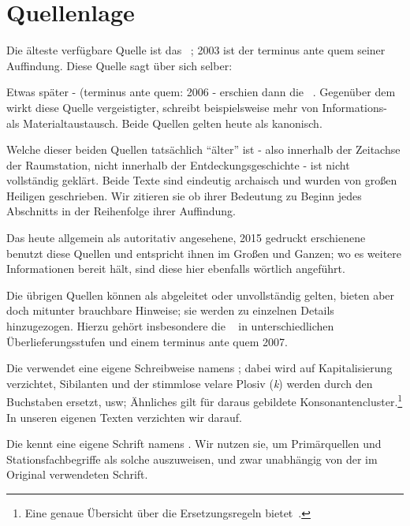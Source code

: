 \section*{Quellenlage}
\fancyhead[LO]{}

Die älteste verfügbare Quelle ist das ~\cite{cbasestarbasemanual}; 2003 ist der terminus ante quem seiner Auffindung. Diese Quelle sagt über sich selber:

Etwas später - (terminus ante quem: 2006 - erschien dann die ~\cite{ctour}. Gegenüber dem  wirkt diese Quelle vergeistigter, schreibt beispielsweise mehr von Informations- als Materialtaustausch. Beide Quellen gelten heute als kanonisch.

Welche dieser beiden Quellen tatsächlich "`älter"' ist - also innerhalb der Zeitachse der Raumstation, nicht innerhalb der Entdeckungsgeschichte - ist nicht vollständig geklärt. 
Beide Texte sind eindeutig archaisch und wurden von großen Heiligen geschrieben.  Wir zitieren sie ob ihrer Bedeutung zu Beginn jedes Abschnitts in der Reihenfolge ihrer Auffindung.

Das heute allgemein als autoritativ angesehene, 2015 gedruckt erschienene ~\cite{cbasebook} benutzt diese Quellen und entspricht ihnen im Großen und Ganzen; wo es weitere Informationen bereit hält, sind diese hier ebenfalls wörtlich angeführt. 

Die übrigen Quellen können als abgeleitet oder unvollständig gelten, bieten aber doch mitunter brauchbare Hinweise; sie werden zu einzelnen Details hinzugezogen. Hierzu gehört  insbesondere die ~\cite{cbasepressemap} in unterschiedlichen Überlieferungsstufen und einem terminus ante quem 2007. 

Die  verwendet eine eigene Schreibweise namens  ; dabei wird auf Kapitalisierung verzichtet,  Sibilanten und der stimmlose velare Plosiv (\emph{k}) werden durch den Buchstaben  ersetzt, usw; Ähnliches gilt für daraus gebildete Konsonantencluster.\footnote{Eine genaue Übersicht über die Ersetzungsregeln bietet~\cite[S.~46]{cbasebook}.} In unseren eigenen Texten verzichten wir darauf.

Die  kennt eine eigene Schrift namens . Wir nutzen sie, um Primärquellen und Stationsfachbegriffe als solche auszuweisen, und zwar unabhängig von der im Original verwendeten Schrift. 

